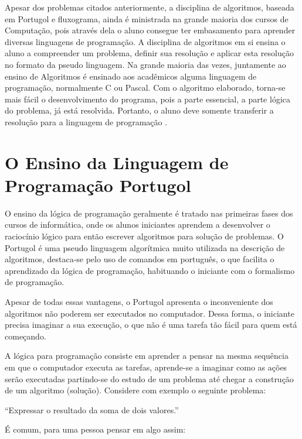Apesar dos problemas citados anteriormente, a disciplina de algoritmos, baseada
em Portugol e fluxograma, ainda é ministrada na grande maioria dos cursos de
Computação, pois através dela o aluno consegue ter embasamento para aprender
diversas linguagens de programação. A disciplina de algoritmos em si ensina o
aluno a compreender um problema, definir sua resolução e aplicar esta resolução
no formato da pseudo linguagem. Na grande maioria das vezes, juntamente ao
ensino de Algoritmos é ensinado aos acadêmicos alguma linguagem de programação,
normalmente C ou Pascal. Com o algoritmo elaborado, torna-se mais fácil o
desenvolvimento do programa, pois a parte essencial, a parte lógica do problema,
já está resolvida. Portanto, o aluno deve somente transferir a resolução para a
linguagem de programação \cite{miranda2004}.

\section{O Ensino da Linguagem de Programação Portugol}

O ensino da lógica de programação geralmente é tratado nas primeiras fases dos
cursos de informática, onde os alunos iniciantes aprendem a desenvolver o
raciocínio lógico para então escrever algoritmos para solução de problemas. O
Portugol é uma pseudo linguagem algorítmica muito utilizada na descrição de
algoritmos, destaca-se pelo uso de comandos em português, o que facilita o
aprendizado da lógica de programação, habituando o iniciante com o formalismo de
programação.

Apesar de todas essas vantagens, o Portugol apresenta o inconveniente dos
algoritmos não poderem ser executados no computador. Dessa forma, o iniciante
precisa imaginar a sua execução, o que não é uma tarefa tão fácil para quem está
começando.

A lógica para programação consiste em aprender a pensar na mesma sequência em
que o computador executa as tarefas, aprende-se a imaginar como as ações serão
executadas partindo-se do estudo de um problema até chegar a construção de um
algoritmo (solução). Considere com exemplo o seguinte problema:

``Expressar o resultado da soma de dois valores.''

É comum, para uma pessoa pensar em algo assim:

